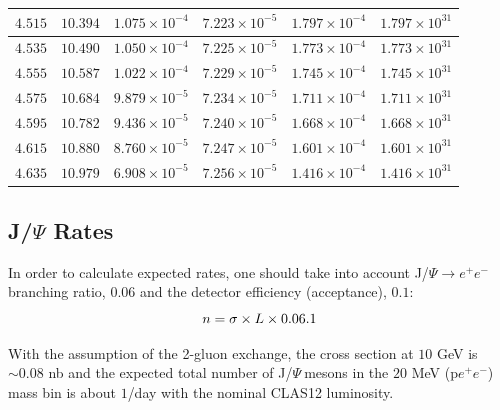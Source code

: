 \documentclass[12pt]{revtex4}
\newcommand{\JP}{J/$\Psi~$}
\begin{document}
\begin{table}[htdp]
\begin{center}
{\begin{tabular}{|c|c|c|c|c|c|}
$4.515$ &  $10.394$ & $1.075\times 10^{-4}$ & $7.223\times 10^{-5}$ & $1.797\times 10^{-4}$ & $1.797\times 10^{31}$\\ \hline
$4.535$ &  $10.490$ & $1.050\times 10^{-4}$ & $7.225\times 10^{-5}$ & $1.773\times 10^{-4}$ & $1.773\times 10^{31}$\\ \hline
$4.555$ &  $10.587$ & $1.022\times 10^{-4}$ & $7.229\times 10^{-5}$ & $1.745\times 10^{-4}$ & $1.745\times 10^{31}$\\ \hline
$4.575$ &  $10.684$ & $9.879\times 10^{-5}$ & $7.234\times 10^{-5}$ & $1.711\times 10^{-4}$ & $1.711\times 10^{31}$\\ \hline
$4.595$ &  $10.782$ & $9.436\times 10^{-5}$ & $7.240\times 10^{-5}$ & $1.668\times 10^{-4}$ & $1.668\times 10^{31}$\\ \hline
$4.615$ &  $10.880$ & $8.760\times 10^{-5}$ & $7.247\times 10^{-5}$ & $1.601\times 10^{-4}$ & $1.601\times 10^{31}$\\ \hline
$4.635$ &  $10.979$ & $6.908\times 10^{-5}$ & $7.256\times 10^{-5}$ & $1.416\times 10^{-4}$ & $1.416\times 10^{31}$ \\ \hline
\end{tabular}
}
\end{center}
\label{tab:flux2}
\end{table}%

\subsection{J/$\Psi$ Rates}

In order to calculate expected rates, one should take into account J/$\Psi\to e^+e^-$ branching ratio, $0.06$ and the detector efficiency (acceptance), $0.1$:
 \begin{equation}
 n=\sigma\times L\times 0.06\time 0.1
 \end{equation}

With the assumption of the 2-gluon exchange, the cross section at $10$ GeV is $\sim 0.08$ nb and the expected total number of \JP mesons in the $20$ MeV (p$e^+e^-$) mass bin is about $1$/day with the nominal CLAS12 luminosity. 
\end{document}
